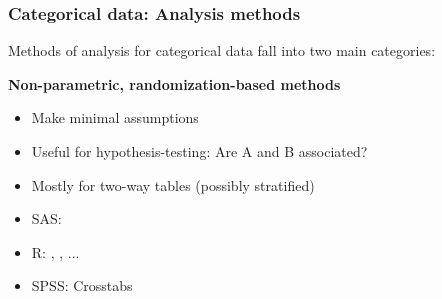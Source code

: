\begin{comment}
\end{itemize}
\end{frame}
\end{comment}

\begin{frame}
	\frametitle{Categorical data: Analysis methods}
Methods of analysis for categorical data fall into two main categories:

\begin{block}{\large\bfseries Non-parametric, randomization-based methods}
    \begin{itemize}
    \item Make minimal assumptions
    \item Useful for \alert{hypothesis-testing}: Are A and B associated?
    \item Mostly for \alert{two-way} tables (possibly stratified)
    \item SAS: 
	\item R: , , ...
	\item SPSS: Crosstabs
    \end{itemize}
\end{block}
\end{frame}

